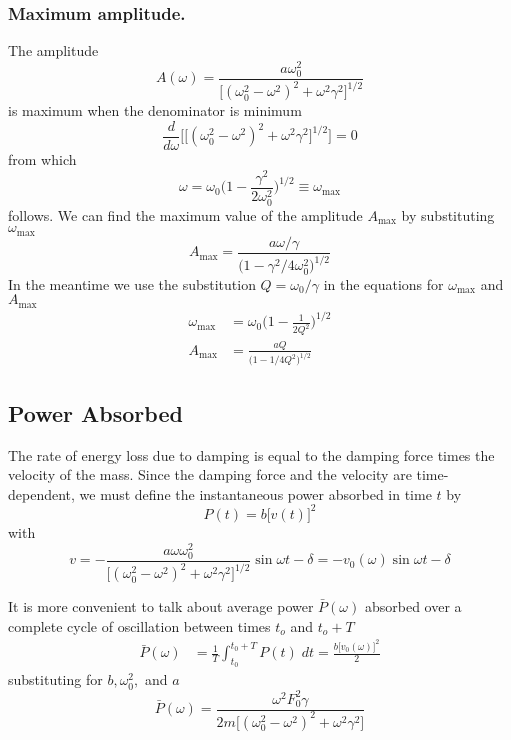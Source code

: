 \documentclass[../../../main.tex]{subfiles}
\begin{document}
\subsubsection*{Maximum amplitude.} The amplitude
\begin{equation*}
    A(\omega)=\frac{a\omega_0^2 }{\big[(\omega_0^2- \omega^2)^2 +\omega^2\gamma^2\big]^{1/2} }
\end{equation*}
is maximum when the denominator is minimum
\begin{equation*}
    \frac{d}{d\omega}\biggl[\big[(\omega_0^2- \omega^2)^2 +\omega^2\gamma^2\big]^{1/2} \biggr]= 0
\end{equation*}
from which 
\begin{equation*}
    \omega=\omega_0\bigg(1-\frac{\gamma^2}{2\omega_0^2}\bigg)^{1/2}\equiv\omega_{\text{max}}
\end{equation*}
follows. We can find the maximum value of the amplitude $A_{\text{max}}$ by substituting $\omega_{\text{max}}$
\begin{equation*}
    A_{\text{max}}=\frac{a\omega/\gamma}{\big(1-\gamma^2/4\omega_0^2 \big)^{1/2}}
\end{equation*}
In the meantime we use the substitution $Q = \omega_0/\gamma$ in the equations for $\omega_{\text{max}}$ and $A_{\text{max}}$
\begin{align*}
    \omega_{\text{max}}&=\omega_0\bigg(1-\frac{1}{2Q^2}\bigg)^{1/2}\\
    A_{\text{max}}&=\frac{aQ}{\big(1-1/4Q^2 \big)^{1/2}}
\end{align*}

\subsection*{Power Absorbed}
The rate of energy loss due to damping is equal to the damping force times the velocity of the mass. 
Since the damping force and the velocity are time-dependent, we must define the instantaneous power absorbed in time $t$ by
\begin{equation*}
    P(t)=b\big[v(t)\big]^2
\end{equation*}
with
\begin{equation*}
    v=-\frac{a\omega\omega_0^2}{\big[(\omega_0^2-\omega^2)^2+\omega^2\gamma^2\big]^{1/2}} \sin \omega t -\delta=-v_0(\omega) \sin \omega t -\delta
\end{equation*}

It is more convenient to talk about average power $ \bar{P} (\omega)$ absorbed over a complete cycle of oscillation between times $t_o$ and $t_o + T$
\begin{align*}
    \bar{P} (\omega)&=\frac{1}{T}\int_{t_0}^{t_0+T}P(t) \;dt=\frac{b\big[v_0(\omega)\big]^2}{2}
\end{align*}
substituting for $b, \omega_0^2,$ and $a$
\begin{equation*}
    \bar{P} (\omega)=\frac{\omega^2F_0^2\gamma}{2m\big[(\omega_0^2-\omega^2)^2+\omega^2 \gamma^2\big]}
\end{equation*}
\end{document}
